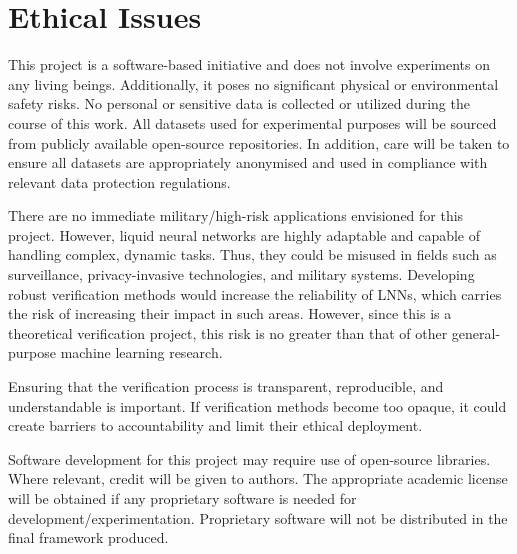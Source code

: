 \chapter{Ethical Issues}

This project is a software-based initiative and does not involve experiments on any living beings. Additionally, it poses no significant physical or environmental safety risks. No personal or sensitive data is collected or utilized during the course of this work. All datasets used for experimental purposes will be sourced from publicly available open-source repositories. In addition, care will be taken to ensure all datasets are appropriately anonymised and used in compliance with relevant data protection regulations.

There are no immediate military/high-risk applications envisioned for this project. However, liquid neural networks are highly adaptable and capable of handling complex, dynamic tasks. Thus, they could be misused in fields such as surveillance, privacy-invasive technologies, and military systems. Developing robust verification methods would increase the reliability of LNNs, which carries the risk of increasing their impact in such areas. However, since this is a theoretical verification project, this risk is no greater than that of other general-purpose machine learning research.

Ensuring that the verification process is transparent, reproducible, and understandable is important. If verification methods become too opaque, it could create barriers to accountability and limit their ethical deployment.

Software development for this project may require use of open-source libraries. Where relevant, credit will be given to authors. The appropriate academic license will be obtained if any proprietary software is needed for development/experimentation. Proprietary software will not be distributed in the final framework produced.